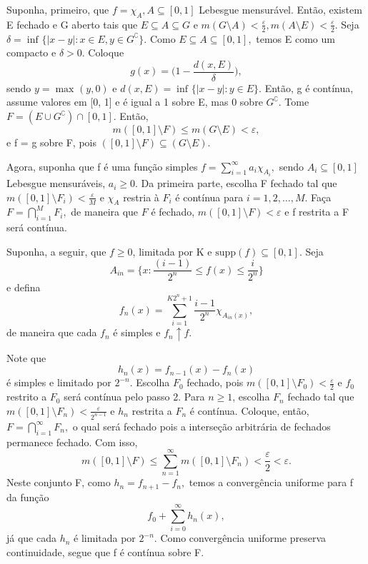 \documentclass[MeasureTheory/measure_theory.tex]{subfiles}
\begin{document}
\begin{proof*}
	Suponha, primeiro, que \(f = \chi_{A}, A\subseteq [0, 1]\) Lebesgue mensurável. Então, existem E fechado e G aberto tais que \(E\subseteq A\subseteq G\) e \(m(G\setminus{A}) < \frac{\varepsilon }{2}, m(A\setminus{E}) < \frac{\varepsilon }{2}\).
	Seja \(\delta = \inf_{}\{|x-y|: x\in E, y\in G ^{\complement}\}.\) Como \(E\subseteq A\subseteq [0, 1],\) temos E como um compacto e \(\delta  > 0.\) Coloque
	\[
		g(x) = \biggl(1 - \frac{d(x, E)}{\delta }\biggr),
	\]
	sendo \(y = \max_{}(y, 0)\) e \(d(x, E) = \inf_{}\{|x-y|:y\in E\}.\) Então, g é contínua, assume valores em [0, 1] e é igual a 1 sobre E, mas 0 sobre \(G ^{\complement}.\) Tome
	\(F = (E\cup G ^{\complement})\cap [0, 1].\) Então,
	\[
		m([0, 1]\setminus{F}) \leq m(G\setminus{E}) < \varepsilon,
	\]
	e f = g sobre F, pois \(([0, 1]\setminus{F})\subseteq (G\setminus{E}).\)

	Agora, suponha que f é uma função simples \(f = \sum\limits_{i=1}^{\infty}a_{i}\chi_{A_{i}},\) sendo \(A_{i}\subseteq [0, 1]\) Lebesgue mensuráveis, \(a_{i} \geq 0.\) Da primeira parte, escolha
	F fechado tal que \(m([0, 1]\setminus{F_{i}}) < \frac{\varepsilon }{M}\) e \(\chi_{A}\) restria à \(F_{i}\) é contínua para \(i=1,2,\dotsc , M.\) Faça \(F = \bigcap_{i=1}^{M}F_{i},\) de maneira que \(F\) é fechado, \(m([0,1]\setminus{F}) < \varepsilon \)
	e f restrita a F será contínua.

	Suponha, a seguir, que \(f\geq 0\), limitada por K e \(\mathrm{supp}(f)\subseteq [0, 1].\) Seja
	\[
		A_{in} = \biggl\{x: \frac{(i-1)}{2^{n}} \leq f(x) \leq \frac{i}{2^{n}}\biggr\}
	\]
	e defina
	\[
		f_{n}(x) = \sum\limits_{i=1}^{K2^{n}+1}\frac{i-1}{2^{n}}\chi_{A_{in}(x)},
	\]
	de maneira que cada \(f_{n}\) é simples e \(f_{n}\uparrow f.\)

	Note que
	\[
		h_{n}(x) = f_{n-1}(x) - f_{n}(x)
	\]
	é simples e limitado por \(2^{-n}.\) Escolha \(F_{0}\) fechado, pois \(m([0, 1]\setminus{F_{0}}) < \frac{\varepsilon }{2}\) e \(f_{0}\) restrito a \(F_{0}\) será contínua pelo passo 2.
	Para \(n\geq 1\), escolha \(F_{n}\) fechado tal que \(m([0, 1]\setminus{F_{n}}) < \frac{\varepsilon }{2^{n-1}}\) e \(h_{n}\) restrita a \(F_{n}\) é contínua. Coloque, então, \(F = \bigcap_{i=1}^{\infty}F_{n},\) o qual
	será fechado pois a interseção arbitrária de fechados permanece fechado. Com isso,
	\[
		m([0,1]\setminus{F}) \leq \sum\limits_{n=1}^{\infty}m([0, 1]\setminus{F_{n}}) < \frac{\varepsilon }{2} < \varepsilon .
	\]
	Neste conjunto F, como \(h_{n} = f_{n+1}-f_{n},\) temos a convergência uniforme para f da função
	\[
		f_{0} + \sum\limits_{i=0}^{\infty}h_{n}(x),
	\]
	já que cada \(h_{n}\) é limitada por \(2^{-n}.\) Como convergência uniforme preserva continuidade, segue que f é contínua sobre F.


\end{proof*}
\end{document}
